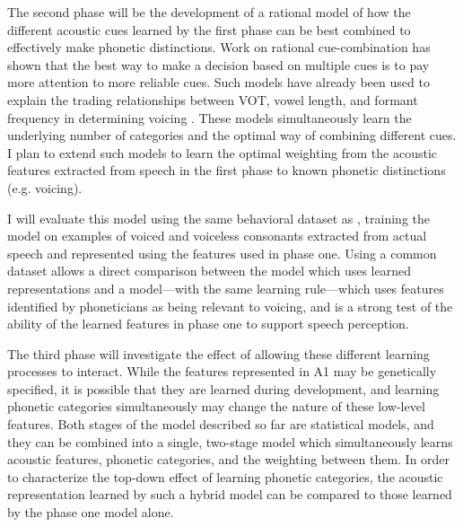 \documentclass[12pt]{article}
\begin{document}
The second phase will be the development of a rational model of how the different acoustic cues learned by the first phase can be best combined to effectively make phonetic distinctions.  Work on rational cue-combination has shown that the best way to make a decision based on multiple cues is to pay more attention to more reliable cues.  Such models have already been used to explain the trading relationships between VOT, vowel length, and formant frequency in determining voicing \cite{Toscano2008}.  These models simultaneously learn the underlying number of categories and the optimal way of combining different cues.  I plan to extend such models to learn the optimal weighting from the acoustic features extracted from speech in the first phase to known phonetic distinctions (e.g. voicing).

I will evaluate this model using the same behavioral dataset as \cite{Toscano2008}, training the model on examples of voiced and voiceless consonants extracted from actual speech and represented using the features used in phase one.  Using a common dataset allows a direct comparison between the model which uses learned representations and a model---with the same learning rule---which uses features identified by phoneticians as being relevant to voicing, and is a strong test of the ability of the learned features in phase one to support speech perception.

The third phase will investigate the effect of allowing these different learning processes to interact.  While the features represented in A1 may be genetically specified, it is possible that they are learned during development, and learning phonetic categories simultaneously may change the nature of these low-level features.  Both stages of the model described so far are statistical models, and they can be combined into a single, two-stage model which simultaneously learns acoustic features, phonetic categories, and the weighting between them.  In order to characterize the top-down effect of learning phonetic categories, the acoustic representation learned by such a hybrid model can be compared to those learned by the phase one model alone.


\end{document}
